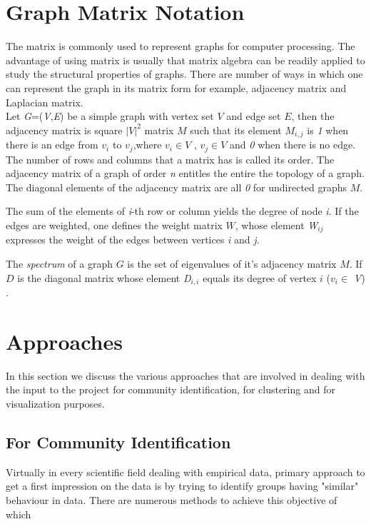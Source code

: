 \section{Graph Matrix Notation}
The matrix is commonly used to represent graphs for computer processing. The advantage of using matrix is usually that matrix algebra can be readily applied to study the structural properties of graphs. There are number of ways in which one can represent the graph in its matrix form for example, adjacency matrix and Laplacian matrix. 
\\
Let \textit{G}=(\textit{V},\textit{E}) be a simple graph with vertex set $V$ and edge set $E$, then the adjacency matrix is square $|V|^2$ matrix $M$ such that its element $M_{i,j}$ is \textit{1} when there is an edge from $v_i$ to $v_j$,where $v_i \in V$ , $ v_j \in V $ and \textit{0} when there is no edge. The number of rows and columns that a matrix has is called its order.
The adjacency matrix of a graph of order \textit{n} entitles the entire the topology of a graph.  The diagonal elements of the adjacency matrix are all \textit{0} for undirected graphs $M$.

\par The sum of the elements of \textit{i}-th row or column yields the degree of node \textit{i}. If the edges are weighted, one defines the weight matrix $W$, whose element \textit{W}$_{ij}$ expresses the weight of the edges between vertices \textit{i} and \textit{j}.

\par The \textit{spectrum} of a graph $G$ is the set of eigenvalues of it's adjacency matrix $M$. If $D$  is the diagonal matrix whose element \textit{D}$_{i,i}$ equals its degree of vertex $i$ ($v_i \in$ \textit{V}) \cite{matrep}.

\section{Approaches}
In this section we discuss the various approaches that are involved in dealing with the input to the project for community identification, for clustering and for visualization purposes. 
\subsection{For Community Identification}
Virtually in every scientific field dealing with empirical data, primary approach to get a first impression on the data is by trying to identify groups having "similar" behaviour in data. There are numerous methods to achieve this objective of which 

